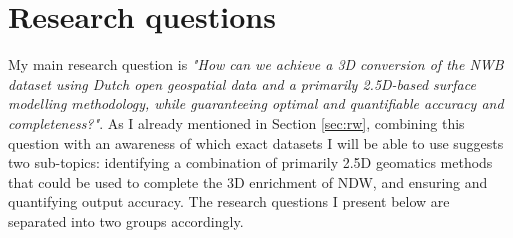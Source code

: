 
\section{Research questions}
\label{sec:rq}

My main research question is \textit{"How can we achieve a 3D conversion of the NWB dataset using Dutch open geospatial data and a primarily 2.5D-based surface modelling methodology, while guaranteeing optimal and quantifiable accuracy and completeness?"}. As I already mentioned in Section \ref{sec:rw}, combining this question with an awareness of which exact datasets I will be able to use suggests two sub-topics: identifying a combination of primarily 2.5D geomatics methods that could be used to complete the 3D enrichment of NDW, and ensuring and quantifying output accuracy. The research questions I present below are separated into two groups accordingly.

